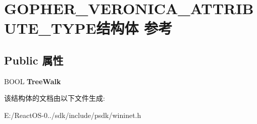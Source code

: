 \hypertarget{struct_g_o_p_h_e_r___v_e_r_o_n_i_c_a___a_t_t_r_i_b_u_t_e___t_y_p_e}{}\section{G\+O\+P\+H\+E\+R\+\_\+\+V\+E\+R\+O\+N\+I\+C\+A\+\_\+\+A\+T\+T\+R\+I\+B\+U\+T\+E\+\_\+\+T\+Y\+P\+E结构体 参考}
\label{struct_g_o_p_h_e_r___v_e_r_o_n_i_c_a___a_t_t_r_i_b_u_t_e___t_y_p_e}
\subsection*{Public 属性}
\begin{DoxyCompactItemize}
\item 
\mbox{\label{struct_g_o_p_h_e_r___v_e_r_o_n_i_c_a___a_t_t_r_i_b_u_t_e___t_y_p_e_a1e5b0ab9ba2dfe28105c580f62e8c7e4}} 
B\+O\+OL {\bfseries Tree\+Walk}
\end{DoxyCompactItemize}


该结构体的文档由以下文件生成\+:\begin{DoxyCompactItemize}
\item 
E\+:/\+React\+O\+S-\/0../sdk/include/psdk/wininet.\+h\end{DoxyCompactItemize}
